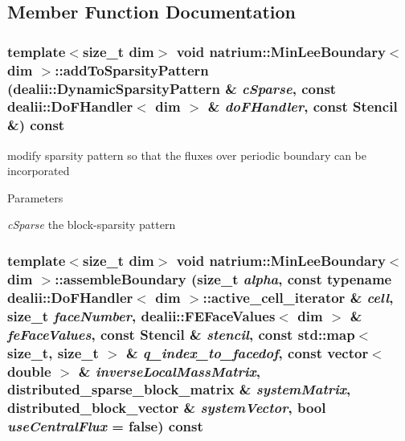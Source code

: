 \subsection{Member Function Documentation}
\hypertarget{classnatrium_1_1MinLeeBoundary_a9d9b16e12b09af906b21cae27102e1c3}{
\subsubsection[{addToSparsityPattern}]{\setlength{\rightskip}{0pt plus 5cm}template$<$size\_\-t dim$>$ void {\bf natrium::MinLeeBoundary}$<$ dim $>$::addToSparsityPattern (dealii::DynamicSparsityPattern \& {\em cSparse}, \/  const dealii::DoFHandler$<$ dim $>$ \& {\em doFHandler}, \/  const {\bf Stencil} \&) const}}
\label{classnatrium_1_1MinLeeBoundary_a9d9b16e12b09af906b21cae27102e1c3}


modify sparsity pattern so that the fluxes over periodic boundary can be incorporated 
\begin{DoxyParams}{Parameters}
\item[{\em cSparse}]the block-\/sparsity pattern \end{DoxyParams}
\hypertarget{classnatrium_1_1MinLeeBoundary_ac23616963c4e9873c2177cdc7f67e159}{
\subsubsection[{assembleBoundary}]{\setlength{\rightskip}{0pt plus 5cm}template$<$size\_\-t dim$>$ void {\bf natrium::MinLeeBoundary}$<$ dim $>$::assembleBoundary (size\_\-t {\em alpha}, \/  const typename dealii::DoFHandler$<$ dim $>$::active\_\-cell\_\-iterator \& {\em cell}, \/  size\_\-t {\em faceNumber}, \/  dealii::FEFaceValues$<$ dim $>$ \& {\em feFaceValues}, \/  const {\bf Stencil} \& {\em stencil}, \/  const std::map$<$ size\_\-t, size\_\-t $>$ \& {\em q\_\-index\_\-to\_\-facedof}, \/  const vector$<$ double $>$ \& {\em inverseLocalMassMatrix}, \/  distributed\_\-sparse\_\-block\_\-matrix \& {\em systemMatrix}, \/  distributed\_\-block\_\-vector \& {\em systemVector}, \/  bool {\em useCentralFlux} = {\ttfamily false}) const}}
\label{classnatrium_1_1MinLeeBoundary_ac23616963c4e9873c2177cdc7f67e159}


